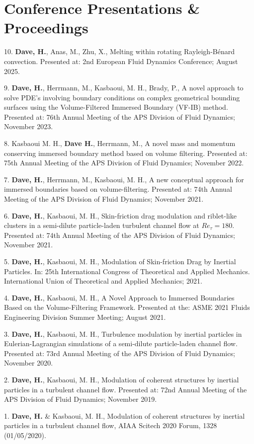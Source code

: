\documentclass[letterpaper,10.8pt]{article}
\begin{document}
\section{Conference Presentations \& Proceedings}
\begin{description}
\item {10. \textbf{Dave, H.}, Anas, M., Zhu, X., Melting within rotating Rayleigh-B\'enard convection. Presented at: 2nd European Fluid Dynamics Conference; August 2025.}
\item {9. \textbf{Dave, H.}, Herrmann, M., Kasbaoui, M. H., Brady, P., A novel approach to solve PDE's involving boundary conditions on complex geometrical bounding surfaces using the Volume-Filtered Immersed Boundary (VF-IB) method. Presented at: 76th Annual Meeting of the APS Division of Fluid Dynamics; November 2023.}
\item {8. Kasbaoui M. H., \textbf{Dave H.}, Herrmann, M., A novel mass and momentum conserving immersed boundary method based on volume filtering. Presented at: 75th Annual Meeting of the APS Division of Fluid Dynamics; November 2022.}
\item {7. \textbf{Dave, H.}, Herrmann, M., Kasbaoui, M. H., A new conceptual approach for immersed boundaries based on volume-filtering. Presented at: 74th Annual Meeting of the APS Division of Fluid Dynamics; November 2021.}
\item {6. \textbf{Dave, H.}, Kasbaoui, M. H., Skin-friction drag modulation and riblet-like clusters in a semi-dilute particle-laden turbulent channel flow at $Re_\tau = 180$. Presented at: 74th Annual Meeting of the APS Division of Fluid Dynamics; November 2021.}
\item {5. \textbf{Dave, H.}, Kasbaoui, M. H., Modulation of Skin-friction Drag by Inertial Particles. In: 25th International Congress of Theoretical and Applied Mechanics. International Union of Theoretical and Applied Mechanics; 2021.}
\item {4. \textbf{Dave, H.}, Kasbaoui, M. H., A Novel Approach to Immersed Boundaries Based on the Volume-Filtering Framework. Presented at the: ASME 2021 Fluids Engineering Division Summer Meeting; August 2021.}
\item {3. \textbf{Dave, H.}, Kasbaoui, M. H., Turbulence modulation by inertial particles in Eulerian-Lagrangian simulations of a semi-dilute particle-laden channel flow. Presented at: 73rd Annual Meeting of the APS Division of Fluid Dynamics; November 2020.}
\item {2. \textbf{Dave, H.}, Kasbaoui, M. H., Modulation of coherent structures by inertial particles in a turbulent channel flow. Presented at: 72nd Annual Meeting of the APS Division of Fluid Dynamics; November 2019.}
\item {1. \textbf{Dave, H.} \& Kasbaoui, M. H., Modulation of coherent structures by inertial particles in a turbulent channel flow, AIAA Scitech 2020 Forum, 1328 (01/05/2020).}
\end{description}
\end{document}
